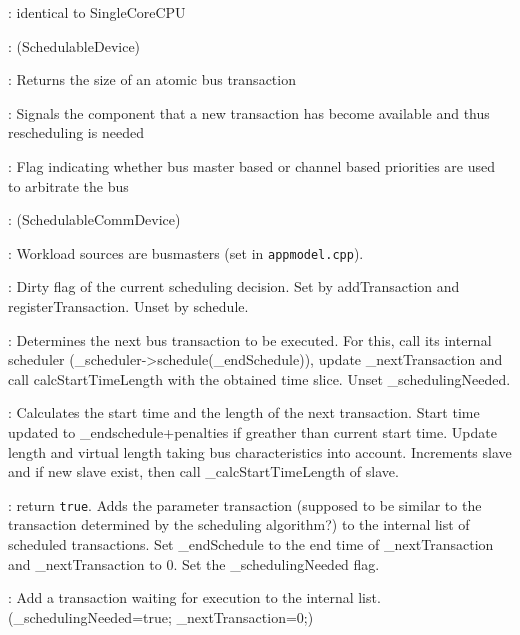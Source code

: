 \documentclass[a4paper,11pt]{article}
\newcommand{\bfont}{\fontseries{b}\selectfont}
\newcommand{\cod}[1]{{\ttfamily #1}}
\newcommand{\class}[2]{\par\vspace{1mm}\hspace{-5mm}\large\colorbox{file}{\textbullet\bfont\cod{#1}:} (\cod{#2})\par}
\newcommand{\method}[1]{\par\vspace{1mm}\hspace{-2mm}\colorbox{method}{\textopenbullet\bfont\cod{#1}:}}
\newcommand{\variable}[1]{\par\vspace{1mm}\hspace{-2mm}\colorbox{variable}{\textopenbullet\bfont\cod{#1}:}}
\begin{document}
\method{truncateNextTransAt(iTime)} identical to \cod{SingleCoreCPU}
\class{SchedulableComDevice}{SchedulableDevice}

\method{getBurstSize} Returns the size of an atomic bus transaction

\method{registerTransaction()} Signals the component that a new transaction has become available and thus rescheduling is needed

\variable{\_channelBasedPrio} Flag indicating whether bus master based or channel based priorities are used to arbitrate the bus

\class{Bus}{SchedulableCommDevice}

\variable{\_scheduler} Workload sources are busmasters (set in {\tt appmodel.cpp}).

\variable{\_schedulingNeeded} Dirty flag of the current scheduling decision. Set by \cod{addTransac\-tion} and \cod{registerTransaction}. Unset by \cod{schedule}.

\method{schedule()} Determines the next bus transaction to be executed. For this, call its internal scheduler (\cod{\_scheduler->schedule(\_endSchedule)}), update \cod{\_nextTransaction} and call \cod{calcStartTimeLength} with the obtained time slice. Unset \cod{\_schedulingNeeded}.

\method{calcStartTimeLength(iTimeSlice)} Calculates the start time and the length of the next transaction. Start time updated to \cod{\_endschedule}+penalties if greather than current start time. Update length and virtual length taking bus characteristics into account. Increments slave and if new slave exist, then call \cod{\_calcStartTimeLength} of slave.

\method{addTransaction(iTransToBeAdded)} return {\tt true}. Adds the parameter transaction (supposed to be similar to the transaction determined by the scheduling algorithm?) to the internal list of scheduled transactions. Set \cod{\_endSchedule} to the end time of \cod{\_nextTransaction} and \cod{\_nextTransaction} to 0. Set the \cod{\_schedulingNeeded} flag.

\method{registerTransaction()} Add a transaction waiting for execution to the internal list. ({\_schedulingNeeded=true; \_nextTransaction=0;})
\end{document}
